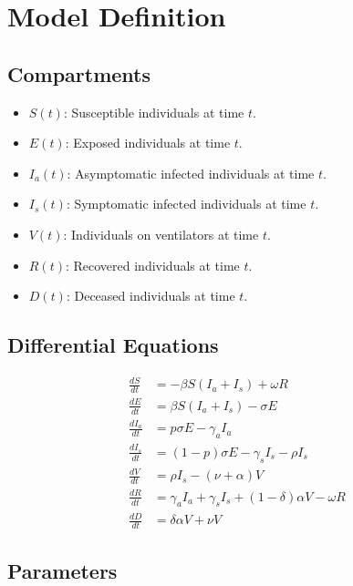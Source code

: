 \documentclass[lettersize, journal]{IEEEtran}
\begin{document}
\section{Model Definition}

\subsection{Compartments}

\begin{itemize}
    \item \( S(t) \): Susceptible individuals at time \( t \).
    \item \( E(t) \): Exposed individuals at time \( t \).
    \item \( I_a(t) \): Asymptomatic infected individuals at time \( t \).
    \item \( I_s(t) \): Symptomatic infected individuals at time \( t \).
    \item \( V(t) \): Individuals on ventilators at time \( t \).
    \item \( R(t) \): Recovered individuals at time \( t \).
    \item \( D(t) \): Deceased individuals at time \( t \).
\end{itemize}

\subsection{Differential Equations}

\begin{align*}
\frac{dS}{dt} & = -\beta S (I_a + I_s) + \omega R \\
\frac{dE}{dt} & = \beta S (I_a + I_s) - \sigma E \\
\frac{dI_a}{dt} & = p \sigma E - \gamma_a I_a \\
\frac{dI_s}{dt} & = (1-p) \sigma E - \gamma_s I_s - \rho I_s \\
\frac{dV}{dt} & = \rho I_s - (\nu + \alpha) V \\
\frac{dR}{dt} & = \gamma_a I_a + \gamma_s I_s + (1-\delta) \alpha V - \omega R \\
\frac{dD}{dt} & = \delta \alpha V + \nu V
\end{align*}

\subsection{Parameters}
\end{document}
